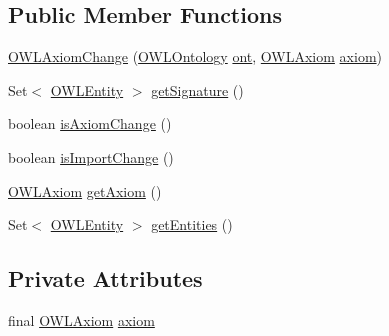 \subsection*{Public Member Functions}
\begin{DoxyCompactItemize}
\item 
\hyperlink{classorg_1_1semanticweb_1_1owlapi_1_1model_1_1_o_w_l_axiom_change_ae1885d3f875c759dc3a9caa65b167d70}{O\-W\-L\-Axiom\-Change} (\hyperlink{interfaceorg_1_1semanticweb_1_1owlapi_1_1model_1_1_o_w_l_ontology}{O\-W\-L\-Ontology} \hyperlink{classorg_1_1semanticweb_1_1owlapi_1_1model_1_1_o_w_l_ontology_change_a9b8b64f1cab33aae500db20e19186211}{ont}, \hyperlink{interfaceorg_1_1semanticweb_1_1owlapi_1_1model_1_1_o_w_l_axiom}{O\-W\-L\-Axiom} \hyperlink{classorg_1_1semanticweb_1_1owlapi_1_1model_1_1_o_w_l_axiom_change_a83ce115af103f6cb9ce7598780a296dc}{axiom})
\item 
Set$<$ \hyperlink{interfaceorg_1_1semanticweb_1_1owlapi_1_1model_1_1_o_w_l_entity}{O\-W\-L\-Entity} $>$ \hyperlink{classorg_1_1semanticweb_1_1owlapi_1_1model_1_1_o_w_l_axiom_change_a2fa259adbccc6ae108675a4615b800eb}{get\-Signature} ()
\item 
boolean \hyperlink{classorg_1_1semanticweb_1_1owlapi_1_1model_1_1_o_w_l_axiom_change_ae2086be231d5e0a26f143c761aaf720d}{is\-Axiom\-Change} ()
\item 
boolean \hyperlink{classorg_1_1semanticweb_1_1owlapi_1_1model_1_1_o_w_l_axiom_change_ad9224a186e51829a05b786d02d97b1e0}{is\-Import\-Change} ()
\item 
\hyperlink{interfaceorg_1_1semanticweb_1_1owlapi_1_1model_1_1_o_w_l_axiom}{O\-W\-L\-Axiom} \hyperlink{classorg_1_1semanticweb_1_1owlapi_1_1model_1_1_o_w_l_axiom_change_adc3a0281bc3189c89db855277604876e}{get\-Axiom} ()
\item 
Set$<$ \hyperlink{interfaceorg_1_1semanticweb_1_1owlapi_1_1model_1_1_o_w_l_entity}{O\-W\-L\-Entity} $>$ \hyperlink{classorg_1_1semanticweb_1_1owlapi_1_1model_1_1_o_w_l_axiom_change_a8f387bb95d9136cc0b9b208c4a8f39a8}{get\-Entities} ()
\end{DoxyCompactItemize}
\subsection*{Private Attributes}
\begin{DoxyCompactItemize}
\item 
final \hyperlink{interfaceorg_1_1semanticweb_1_1owlapi_1_1model_1_1_o_w_l_axiom}{O\-W\-L\-Axiom} \hyperlink{classorg_1_1semanticweb_1_1owlapi_1_1model_1_1_o_w_l_axiom_change_a83ce115af103f6cb9ce7598780a296dc}{axiom}
\end{DoxyCompactItemize}


